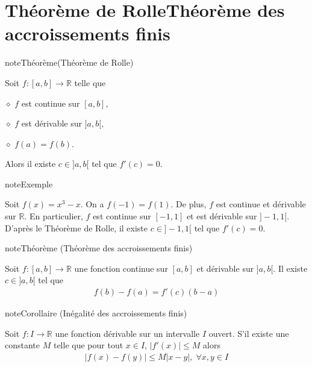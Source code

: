\documentclass[letterpaper,10pt,french]{jupyterBook}
\begin{document}
\section{Théorème de Rolle\sphinxhyphen{}Théorème des accroissements finis}
\label{\detokenize{dirivfs:theoreme-de-rolle-theoreme-des-accroissements-finis}}
\begin{sphinxadmonition}{note}{Théorème(Théorème de Rolle)}

\sphinxAtStartPar
Soit \(f:[a,b]\rightarrow\mathbb{R}\) telle que

\sphinxAtStartPar
\(\diamond\) \(f\) est continue sur \([a,b],\)

\sphinxAtStartPar
\(\diamond\) \(f\) est dérivable sur \(]a,b[,\)

\sphinxAtStartPar
\(\diamond\) \(f(a)=f(b).\)

\sphinxAtStartPar
Alors il existe \(c\in ]a,b[\) tel que \(f'(c)=0.\)
\end{sphinxadmonition}

\begin{sphinxadmonition}{note}{Exemple}

\sphinxAtStartPar
Soit \(f(x)=x^3-x.\) On a \(f(-1)=f(1).\) De plus, \(f\) est continue et dérivable sur \(\mathbb{R}.\) En particulier, \(f\) est continue sur \([-1,1]\) et est dérivable sur \(]-1,1[.\) D’après le Théorème de Rolle, il existe \(c\in ]-1,1[\) tel que \(f'(c)=0.\)
\end{sphinxadmonition}

\begin{sphinxadmonition}{note}{Théorème (Théorème des accroissements finis)}

\sphinxAtStartPar
Soit \(f:[a,b]\rightarrow \mathbb{R}\) une fonction continue sur \([a,b]\) et dérivable sur \(]a,b[.\) Il existe \(c\in ]a,b[\) tel que
\begin{equation*}
\begin{split}
f(b)-f(a)=f'(c)(b-a)
\end{split}
\end{equation*}\end{sphinxadmonition}

\begin{sphinxadmonition}{note}{Corollaire (Inégalité des accroissements finis)}

\sphinxAtStartPar
Soit \(f:I\rightarrow\mathbb{R}\) une fonction dérivable sur un intervalle \(I\) ouvert. S’il existe une constante \(M\) telle que pour tout \(x\in I,\,|f'(x)|\leq M\) alors
\begin{equation*}
\begin{split}
|f(x)-f(y)|\leq M|x-y|,\;\forall x,y\in I
\end{split}
\end{equation*}\end{sphinxadmonition}
\end{document}
